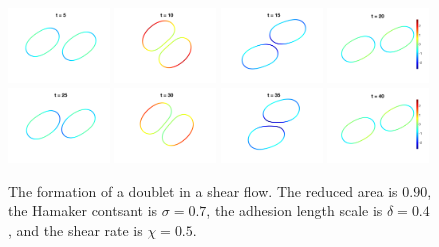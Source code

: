 \documentclass[aps,prl,twocolumn,showpacs,amsmath,amssymb]{revtex4-1}
\begin{document}
\begin{figure}[htp]
  \includegraphics[width=0.24\textwidth]{figs/adR4em1adS7em1Chi5em1_ra090_image01.png}
  \includegraphics[width=0.24\textwidth]{figs/adR4em1adS7em1Chi5em1_ra090_image02.png}
  \includegraphics[width=0.24\textwidth]{figs/adR4em1adS7em1Chi5em1_ra090_image03.png}
  \includegraphics[width=0.24\textwidth]{figs/adR4em1adS7em1Chi5em1_ra090_image04.png}
  \includegraphics[width=0.24\textwidth]{figs/adR4em1adS7em1Chi5em1_ra090_image05.png}
  \includegraphics[width=0.24\textwidth]{figs/adR4em1adS7em1Chi5em1_ra090_image06.png}
  \includegraphics[width=0.24\textwidth]{figs/adR4em1adS7em1Chi5em1_ra090_image07.png}
  \includegraphics[width=0.24\textwidth]{figs/adR4em1adS7em1Chi5em1_ra090_image08.png}
  \caption{\label{fig:doublet090} The formation of a doublet in a shear
  flow.  The reduced area is $0.90$, the Hamaker contsant is $\sigma=0.7$, the
adhesion length scale is $\delta = 0.4$, and the shear rate is $\chi=0.5$.}
\end{figure}
\end{document}
